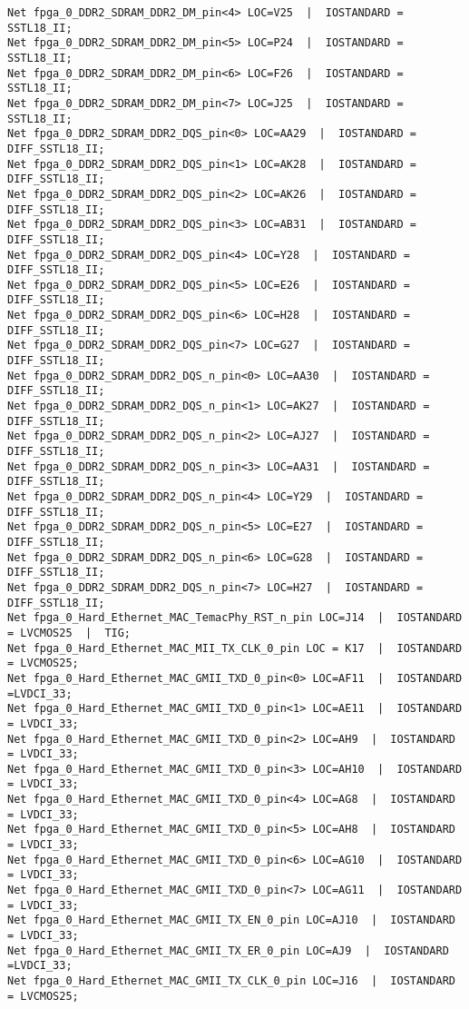 \begin{verbatim}
Net fpga_0_DDR2_SDRAM_DDR2_DM_pin<4> LOC=V25  |  IOSTANDARD = SSTL18_II;
Net fpga_0_DDR2_SDRAM_DDR2_DM_pin<5> LOC=P24  |  IOSTANDARD = SSTL18_II;
Net fpga_0_DDR2_SDRAM_DDR2_DM_pin<6> LOC=F26  |  IOSTANDARD = SSTL18_II;
Net fpga_0_DDR2_SDRAM_DDR2_DM_pin<7> LOC=J25  |  IOSTANDARD = SSTL18_II;
Net fpga_0_DDR2_SDRAM_DDR2_DQS_pin<0> LOC=AA29  |  IOSTANDARD = DIFF_SSTL18_II;
Net fpga_0_DDR2_SDRAM_DDR2_DQS_pin<1> LOC=AK28  |  IOSTANDARD = DIFF_SSTL18_II;
Net fpga_0_DDR2_SDRAM_DDR2_DQS_pin<2> LOC=AK26  |  IOSTANDARD = DIFF_SSTL18_II;
Net fpga_0_DDR2_SDRAM_DDR2_DQS_pin<3> LOC=AB31  |  IOSTANDARD = DIFF_SSTL18_II;
Net fpga_0_DDR2_SDRAM_DDR2_DQS_pin<4> LOC=Y28  |  IOSTANDARD = DIFF_SSTL18_II;
Net fpga_0_DDR2_SDRAM_DDR2_DQS_pin<5> LOC=E26  |  IOSTANDARD = DIFF_SSTL18_II;
Net fpga_0_DDR2_SDRAM_DDR2_DQS_pin<6> LOC=H28  |  IOSTANDARD = DIFF_SSTL18_II;
Net fpga_0_DDR2_SDRAM_DDR2_DQS_pin<7> LOC=G27  |  IOSTANDARD = DIFF_SSTL18_II;
Net fpga_0_DDR2_SDRAM_DDR2_DQS_n_pin<0> LOC=AA30  |  IOSTANDARD = DIFF_SSTL18_II;
Net fpga_0_DDR2_SDRAM_DDR2_DQS_n_pin<1> LOC=AK27  |  IOSTANDARD = DIFF_SSTL18_II;
Net fpga_0_DDR2_SDRAM_DDR2_DQS_n_pin<2> LOC=AJ27  |  IOSTANDARD = DIFF_SSTL18_II;
Net fpga_0_DDR2_SDRAM_DDR2_DQS_n_pin<3> LOC=AA31  |  IOSTANDARD = DIFF_SSTL18_II;
Net fpga_0_DDR2_SDRAM_DDR2_DQS_n_pin<4> LOC=Y29  |  IOSTANDARD = DIFF_SSTL18_II;
Net fpga_0_DDR2_SDRAM_DDR2_DQS_n_pin<5> LOC=E27  |  IOSTANDARD = DIFF_SSTL18_II;
Net fpga_0_DDR2_SDRAM_DDR2_DQS_n_pin<6> LOC=G28  |  IOSTANDARD = DIFF_SSTL18_II;
Net fpga_0_DDR2_SDRAM_DDR2_DQS_n_pin<7> LOC=H27  |  IOSTANDARD = DIFF_SSTL18_II;
Net fpga_0_Hard_Ethernet_MAC_TemacPhy_RST_n_pin LOC=J14  |  IOSTANDARD = LVCMOS25  |  TIG;
Net fpga_0_Hard_Ethernet_MAC_MII_TX_CLK_0_pin LOC = K17  |  IOSTANDARD = LVCMOS25;
Net fpga_0_Hard_Ethernet_MAC_GMII_TXD_0_pin<0> LOC=AF11  |  IOSTANDARD =LVDCI_33;
Net fpga_0_Hard_Ethernet_MAC_GMII_TXD_0_pin<1> LOC=AE11  |  IOSTANDARD = LVDCI_33;
Net fpga_0_Hard_Ethernet_MAC_GMII_TXD_0_pin<2> LOC=AH9  |  IOSTANDARD = LVDCI_33;
Net fpga_0_Hard_Ethernet_MAC_GMII_TXD_0_pin<3> LOC=AH10  |  IOSTANDARD = LVDCI_33;
Net fpga_0_Hard_Ethernet_MAC_GMII_TXD_0_pin<4> LOC=AG8  |  IOSTANDARD = LVDCI_33;
Net fpga_0_Hard_Ethernet_MAC_GMII_TXD_0_pin<5> LOC=AH8  |  IOSTANDARD = LVDCI_33;
Net fpga_0_Hard_Ethernet_MAC_GMII_TXD_0_pin<6> LOC=AG10  |  IOSTANDARD = LVDCI_33;
Net fpga_0_Hard_Ethernet_MAC_GMII_TXD_0_pin<7> LOC=AG11  |  IOSTANDARD = LVDCI_33;
Net fpga_0_Hard_Ethernet_MAC_GMII_TX_EN_0_pin LOC=AJ10  |  IOSTANDARD = LVDCI_33;
Net fpga_0_Hard_Ethernet_MAC_GMII_TX_ER_0_pin LOC=AJ9  |  IOSTANDARD =LVDCI_33;
Net fpga_0_Hard_Ethernet_MAC_GMII_TX_CLK_0_pin LOC=J16  |  IOSTANDARD = LVCMOS25;

\end{verbatim}
